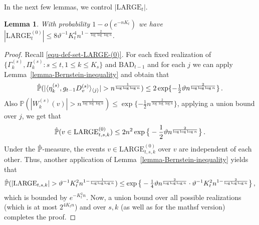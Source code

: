 \documentclass[11pt]{article}
\newtheorem{Lemma}[Theorem]{Lemma}
\numberwithin{equation}{section}
\begin{document}
In the next few lemmas, we control $|\mathrm{LARGE}_t|$. 

\begin{Lemma} {\label{lemma-bound-cardinality-LARGE-(0)}}
With probability $1-o(e^{-n K_t})$ we have $|\mathrm{LARGE}^{(0)}_t| \leq 8 \vartheta^{-1} K^4_t n^{ 1 - \frac{2} {\log \log \log n}} $.
\end{Lemma}
\begin{proof}
Recall \eqref{equ-def-set-LARGE-(0)}. For each fixed realization of $\{ \Gamma^{(s)}_k, \Pi^{(s)}_k : s\leq t, 1\leq k\leq K_s \}$ and $\mathrm{BAD}_{t-1}$ and for each $j$ we can apply  Lemma~\ref{lemma-Bernstein-inequality} and obtain that 
\begin{align*}
    \Hat{\mathbb P} (| \langle \eta^{(s)}_k, g_{t-1} D^{(s)}_v \rangle_{\langle j \rangle} | > n^{ \frac{1} {\log \log \log n}}) \leq 2 \exp \{ - \tfrac{1}{2} \vartheta n^{ \frac{2} {\log \log \log n}} \}\,.
\end{align*}
Also $\mathbb{P}( |W^{(s)}_k(v)| > n^{\frac{1}{\log \log \log n}} ) \leq \exp \{ - \frac{1}{2} n^{\frac{2}{\log \log \log n }} \}$, applying a union bound over $j$, we get that
\begin{align*}
    \Hat{\mathbb P} (v \in \mathrm{LARGE}^{(0)}_{t,s,k}) \leq 2 n^2 \exp \big\{ - \frac{1}{2} \vartheta n^{ \frac{2} {\log \log \log n}} \big\}\,.
\end{align*}
Under the $\Hat{\mathbb P}$-measure, the events $v\in \mathrm{LARGE}^{(0)}_{t,s,k}$ over $v$ are independent of each other. Thus, another application of Lemma~\ref{lemma-Bernstein-inequality} yields that 
\begin{align*}
    \Hat{\mathbb P}(|\mathrm{LARGE}_{t,s,k}| > \vartheta^{-1} K^2_t n^{ 1 - \frac{1} {\log \log \log n}}) \leq \exp \big\{ - \tfrac{1}{4} \vartheta n^{ \frac{2}{\log \log \log n}} \cdot \vartheta^{-1} K^2_t n^{ 1- \frac{2} {\log \log \log n}} \big\}\,,
\end{align*}
which is bounded by $e^{- K_t^2 n }$. Now, a union bound over all possible realizations (which is at most $2^{4 K_t n}$) and over $s, k$ (as well as for the mathsf version) completes the proof. 
\end{proof}
\end{document}
